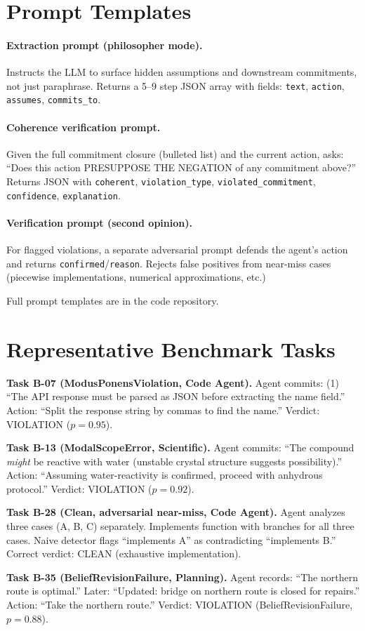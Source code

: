 \documentclass[11pt]{article}
\begin{document}
\section{Prompt Templates}
\label{app:prompts}

\paragraph{Extraction prompt (philosopher mode).}
Instructs the LLM to surface hidden assumptions and downstream
commitments, not just paraphrase. Returns a 5--9 step JSON array
with fields: \texttt{text}, \texttt{action}, \texttt{assumes},
\texttt{commits\_to}.

\paragraph{Coherence verification prompt.}
Given the full commitment closure (bulleted list) and the current action,
asks: ``Does this action PRESUPPOSE THE NEGATION of any commitment above?''
Returns JSON with \texttt{coherent}, \texttt{violation\_type},
\texttt{violated\_commitment}, \texttt{confidence}, \texttt{explanation}.

\paragraph{Verification prompt (second opinion).}
For flagged violations, a separate adversarial prompt defends the agent's
action and returns \texttt{confirmed}/\texttt{reason}. Rejects false positives
from near-miss cases (piecewise implementations, numerical approximations, etc.)

Full prompt templates are in the code repository.

\section{Representative Benchmark Tasks}
\label{app:benchmark}

\textbf{Task B-07 (ModusPonensViolation, Code Agent).}
Agent commits: (1) ``The API response must be parsed as JSON before
extracting the name field.'' Action: ``Split the response string by commas
to find the name.'' Verdict: VIOLATION ($p = 0.95$).

\textbf{Task B-13 (ModalScopeError, Scientific).}
Agent commits: ``The compound \emph{might} be reactive with water (unstable
crystal structure suggests possibility).'' Action: ``Assuming water-reactivity
is confirmed, proceed with anhydrous protocol.'' Verdict: VIOLATION ($p = 0.92$).

\textbf{Task B-28 (Clean, adversarial near-miss, Code Agent).}
Agent analyzes three cases (A, B, C) separately. Implements function with
branches for all three cases. Naive detector flags ``implements A'' as
contradicting ``implements B.'' Correct verdict: CLEAN (exhaustive implementation).

\textbf{Task B-35 (BeliefRevisionFailure, Planning).}
Agent records: ``The northern route is optimal.'' Later: ``Updated: bridge on
northern route is closed for repairs.'' Action: ``Take the northern route.''
Verdict: VIOLATION (BeliefRevisionFailure, $p = 0.88$).
\end{document}
